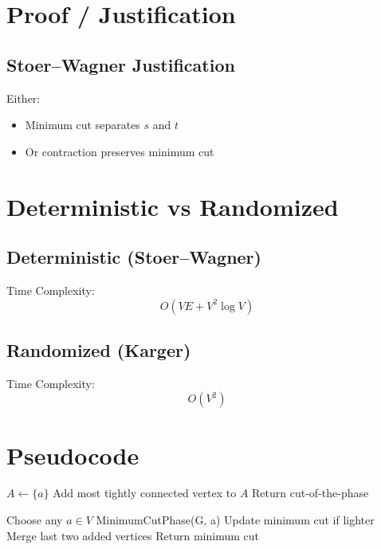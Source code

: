 \documentclass[12pt]{article}
\begin{document}
\section{Proof / Justification}

\subsection{Stoer--Wagner Justification}
Either:
\begin{itemize}
    \item Minimum cut separates $s$ and $t$
    \item Or contraction preserves minimum cut
\end{itemize}

\section{Deterministic vs Randomized}

\subsection{Deterministic (Stoer--Wagner)}
Time Complexity:
\[
O(VE + V^2 \log V)
\]

\subsection{Randomized (Karger)}
Time Complexity:
\[
O(V^2)
\]

\section{Pseudocode}

\begin{algorithm}
\caption{MinimumCutPhase(G, a)}
\begin{algorithmic}
\STATE $A \leftarrow \{a\}$
    \STATE Add most tightly connected vertex to $A$
\ENDWHILE
\STATE Return cut-of-the-phase
\end{algorithmic}
\end{algorithm}

\begin{algorithm}
\caption{MinimumCut(G)}
\begin{algorithmic}
    \STATE Choose any $a \in V$
    \STATE MinimumCutPhase(G, a)
    \STATE Update minimum cut if lighter
    \STATE Merge last two added vertices
\ENDWHILE
\STATE Return minimum cut
\end{algorithmic}
\end{algorithm}
\end{document}
